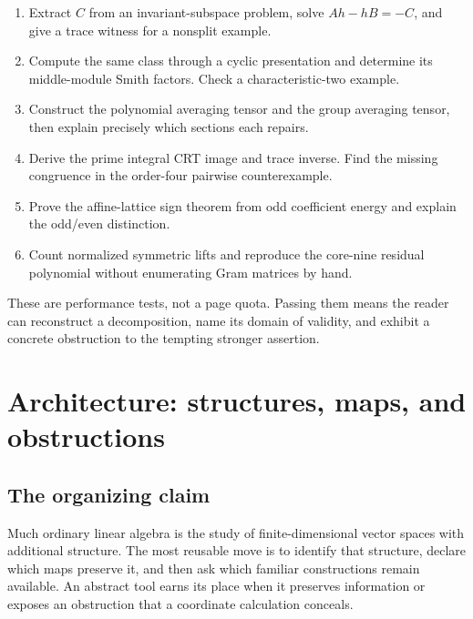\documentclass[
  11pt,
]{article}
\providecommand{\tightlist}{%
  \setlength{\itemsep}{0pt}\setlength{\parskip}{0pt}}
\begin{document}
\begin{enumerate}
\def\labelenumi{\arabic{enumi}.}
\tightlist
\item
  Extract \(C\) from an invariant-subspace problem, solve \(Ah-hB=-C\),
  and give a trace witness for a nonsplit example.
\item
  Compute the same class through a cyclic presentation and determine its
  middle-module Smith factors. Check a characteristic-two example.
\item
  Construct the polynomial averaging tensor and the group averaging
  tensor, then explain precisely which sections each repairs.
\item
  Derive the prime integral CRT image and trace inverse. Find the
  missing congruence in the order-four pairwise counterexample.
\item
  Prove the affine-lattice sign theorem from odd coefficient energy and
  explain the odd/even distinction.
\item
  Count normalized symmetric lifts and reproduce the core-nine residual
  polynomial without enumerating Gram matrices by hand.
\end{enumerate}

These are performance tests, not a page quota. Passing them means the
reader can reconstruct a decomposition, name its domain of validity, and
exhibit a concrete obstruction to the tempting stronger assertion.

\section*{Architecture: structures, maps, and
obstructions}\label{architecture-structures-maps-and-obstructions}

\subsection*{The organizing claim}\label{the-organizing-claim}

Much ordinary linear algebra is the study of finite-dimensional vector
spaces with additional structure. The most reusable move is to identify
that structure, declare which maps preserve it, and then ask which
familiar constructions remain available. An abstract tool earns its
place when it preserves information or exposes an obstruction that a
coordinate calculation conceals.
\end{document}
